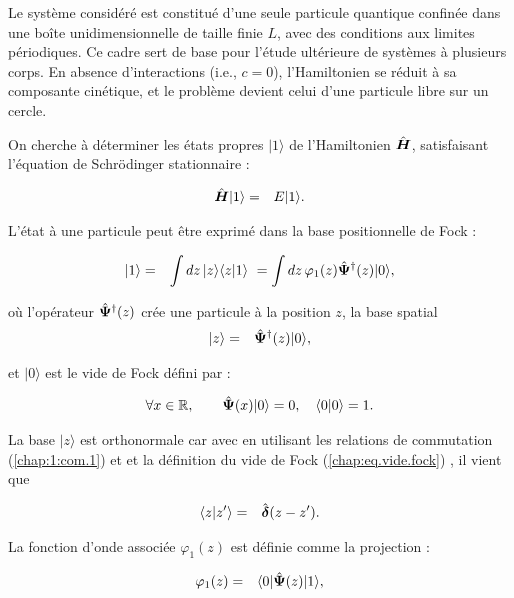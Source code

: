 Le système considéré est constitué d’une seule particule quantique confinée dans une boîte unidimensionnelle de taille finie \(L\), avec des conditions aux limites périodiques. Ce cadre sert de base pour l’étude ultérieure de systèmes à plusieurs corps. En absence d’interactions (i.e., \(c = 0\)), l’Hamiltonien se réduit à sa composante cinétique, et le problème devient celui d’une particule libre sur un cercle.

On cherche à déterminer les états propres \(\vert 1 \rangle\) de l’Hamiltonien \(\hat{\bm{H}}\), satisfaisant l’équation de Schrödinger stationnaire :

\begin{eqnarray}
	\hat{\bm{H}} \vert 1 \rangle & = & E \vert 1 \rangle.
\end{eqnarray}

L’état à une particule peut être exprimé dans la base positionnelle de Fock :

\begin{eqnarray}
	\vert 1 \rangle & = & \int dz\, \vert z \rangle \langle z \vert 1 \rangle ~= \int dz\, \varphi_1(z) \hat{\bm{\Psi}}^\dag(z) \vert 0 \rangle,
\end{eqnarray}

où l’opérateur \(\hat{\bm{\Psi}}^\dag(z)\) crée une particule à la position \(z\), la base spatial
\begin{eqnarray}
	\vert z \rangle  & = & \hat{\bm{\Psi}}^\dag (z)\vert 0 \rangle ,
\end{eqnarray}

et \(\vert 0 \rangle\) est le vide de Fock défini par :

\begin{eqnarray}
	\forall x \in \mathbb{R}, \qquad \hat{\bm{\Psi}}(x) \vert 0 \rangle = 0 ,\quad  \langle 0\vert 0 \rangle = 1. \label{chap:eq.vide.fock}
\end{eqnarray}

La base $\vert z \rangle$ est orthonormale car avec en utilisant les relations de commutation (\ref{chap:1:com.1}) et et la définition du vide de Fock (\ref{chap:eq.vide.fock}) , il vient que 

\begin{eqnarray}
	\langle z\vert z' \rangle  & = & \hat{\bm{\delta}}(z -z').
\end{eqnarray}



La fonction d’onde associée \(\varphi_1(z)\) est définie comme la projection :

\begin{eqnarray}
	\varphi_1(z) & = & \langle 0 \vert \hat{\bm{\Psi}}(z) \vert 1 \rangle,
\end{eqnarray}


